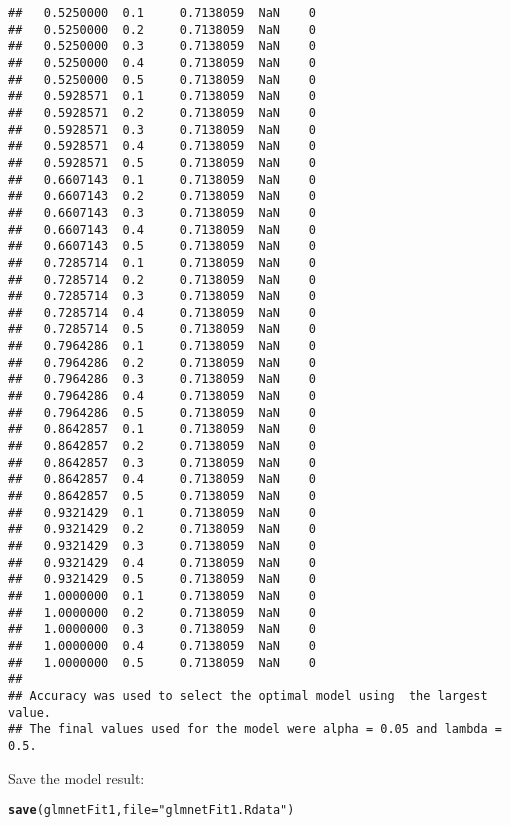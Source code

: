 \documentclass{article}\usepackage[]{graphicx}\usepackage[]{color}
\makeatletter
\newcommand{\hlstr}[1]{\textcolor[rgb]{0.192,0.494,0.8}{#1}}%
\newcommand{\hlstd}[1]{\textcolor[rgb]{0.345,0.345,0.345}{#1}}%
\newcommand{\hlkwc}[1]{\textcolor[rgb]{0.333,0.667,0.333}{#1}}%
\newcommand{\hlkwd}[1]{\textcolor[rgb]{0.737,0.353,0.396}{\textbf{#1}}}%
\newenvironment{kframe}{%
 \def\at@end@of@kframe{}%
 \ifinner\ifhmode%
  \def\at@end@of@kframe{\end{minipage}}%
  \begin{minipage}{\columnwidth}%
 \fi\fi%
 \def\FrameCommand##1{\hskip\@totalleftmargin \hskip-\fboxsep
 \colorbox{shadecolor}{##1}\hskip-\fboxsep
     \hskip-\linewidth \hskip-\@totalleftmargin \hskip\columnwidth}%
 \MakeFramed {\advance\hsize-\width
   \@totalleftmargin\z@ \linewidth\hsize
   \@setminipage}}%
 {\par\unskip\endMakeFramed%
 \at@end@of@kframe}
\newenvironment{knitrout}{}{} %
\makeatother
\begin{document}
\begin{knitrout}
\begin{kframe}
\begin{verbatim}
##   0.5250000  0.1     0.7138059  NaN    0          
##   0.5250000  0.2     0.7138059  NaN    0          
##   0.5250000  0.3     0.7138059  NaN    0          
##   0.5250000  0.4     0.7138059  NaN    0          
##   0.5250000  0.5     0.7138059  NaN    0          
##   0.5928571  0.1     0.7138059  NaN    0          
##   0.5928571  0.2     0.7138059  NaN    0          
##   0.5928571  0.3     0.7138059  NaN    0          
##   0.5928571  0.4     0.7138059  NaN    0          
##   0.5928571  0.5     0.7138059  NaN    0          
##   0.6607143  0.1     0.7138059  NaN    0          
##   0.6607143  0.2     0.7138059  NaN    0          
##   0.6607143  0.3     0.7138059  NaN    0          
##   0.6607143  0.4     0.7138059  NaN    0          
##   0.6607143  0.5     0.7138059  NaN    0          
##   0.7285714  0.1     0.7138059  NaN    0          
##   0.7285714  0.2     0.7138059  NaN    0          
##   0.7285714  0.3     0.7138059  NaN    0          
##   0.7285714  0.4     0.7138059  NaN    0          
##   0.7285714  0.5     0.7138059  NaN    0          
##   0.7964286  0.1     0.7138059  NaN    0          
##   0.7964286  0.2     0.7138059  NaN    0          
##   0.7964286  0.3     0.7138059  NaN    0          
##   0.7964286  0.4     0.7138059  NaN    0          
##   0.7964286  0.5     0.7138059  NaN    0          
##   0.8642857  0.1     0.7138059  NaN    0          
##   0.8642857  0.2     0.7138059  NaN    0          
##   0.8642857  0.3     0.7138059  NaN    0          
##   0.8642857  0.4     0.7138059  NaN    0          
##   0.8642857  0.5     0.7138059  NaN    0          
##   0.9321429  0.1     0.7138059  NaN    0          
##   0.9321429  0.2     0.7138059  NaN    0          
##   0.9321429  0.3     0.7138059  NaN    0          
##   0.9321429  0.4     0.7138059  NaN    0          
##   0.9321429  0.5     0.7138059  NaN    0          
##   1.0000000  0.1     0.7138059  NaN    0          
##   1.0000000  0.2     0.7138059  NaN    0          
##   1.0000000  0.3     0.7138059  NaN    0          
##   1.0000000  0.4     0.7138059  NaN    0          
##   1.0000000  0.5     0.7138059  NaN    0          
## 
## Accuracy was used to select the optimal model using  the largest value.
## The final values used for the model were alpha = 0.05 and lambda = 0.5.
\end{verbatim}
\end{kframe}
\end{knitrout}

Save the model result:
\begin{knitrout}
\color{fgcolor}\begin{kframe}
\begin{alltt}
\hlkwd{save}\hlstd{(glmnetFit1,} \hlkwc{file}\hlstd{=}\hlstr{"glmnetFit1.Rdata"}\hlstd{)}
\end{alltt}
\end{kframe}
\end{knitrout}
\end{document}
